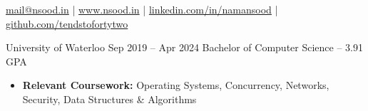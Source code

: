 \documentclass{article}
\begin{document}
    
\vspace{1mm}
{
  \hfill
  \href{mailto:mail@nsood.in}{mail@nsood.in} | 
  \href{https://www.nsood.in}{www.nsood.in} | 
  \href{https://linkedin.com/in/namansood}{linkedin.com/in/namansood} |
  \href{https://github.com/tendstofortytwo}{github.com/tendstofortytwo}
  \hfill
}

\EducationEntry
  {University of Waterloo}
  {Sep 2019 -- Apr 2024}
  {Bachelor of Computer Science -- 3.91 GPA}
  {
    \begin{itemize} \itemsep -1pt
      \item \textbf{Relevant Coursework:} Operating Systems, Concurrency, Networks, Security, Data Structures \& Algorithms
    \end{itemize}
  }

\vspace{1mm} %
\end{document}
